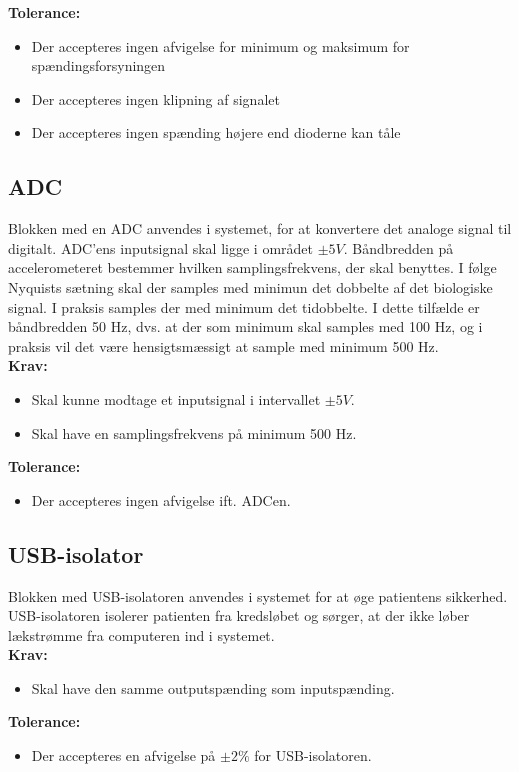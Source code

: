 \textbf{Tolerance:}
\begin{itemize}
\item Der accepteres ingen afvigelse for minimum og maksimum for spændingsforsyningen
\item Der accepteres ingen klipning af signalet
\item Der accepteres ingen spænding højere end dioderne kan tåle 
\end{itemize}
\subsection{ADC}
Blokken med en ADC anvendes i systemet, for at konvertere det analoge signal til digitalt. %
ADC'ens inputsignal skal ligge i området $\pm 5 V$. Båndbredden på accelerometeret bestemmer hvilken samplingsfrekvens, der skal benyttes. I følge Nyquists sætning skal der samples med minimun det dobbelte af det biologiske signal. I praksis samples der med minimum det tidobbelte. I dette tilfælde er båndbredden 50 Hz, dvs. at der som minimum skal samples med 100 Hz, og i praksis vil det være hensigtsmæssigt at sample med minimum 500 Hz. \\
\textbf{Krav:}
\begin{itemize}
	\item Skal kunne modtage et inputsignal i intervallet $\pm 5 V$.
	\item Skal have en samplingsfrekvens på minimum 500 Hz.
\end{itemize}
\textbf{Tolerance:}
\begin{itemize}
	\item Der accepteres ingen afvigelse ift. ADCen.
\end{itemize}
\subsection{USB-isolator}\label{kravspecifikationer_USB}
Blokken med USB-isolatoren anvendes i systemet for at øge patientens sikkerhed. USB-isolatoren isolerer patienten fra kredsløbet og sørger, at der ikke løber lækstrømme fra computeren ind i systemet.\\
\textbf{Krav:}
\begin{itemize}
	\item Skal have den samme outputspænding som inputspænding. 
\end{itemize}
\textbf{Tolerance:}
\begin{itemize}
	\item Der accepteres en afvigelse på $\pm 2 \%$ for USB-isolatoren. 
\end{itemize}
